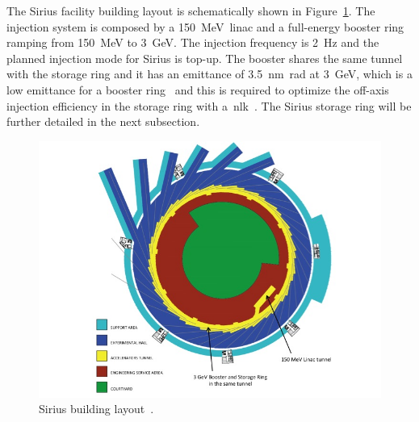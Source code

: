 The Sirius facility building layout is schematically shown in Figure~\ref{fig:sirius_building}. The injection system is composed by a \SI{150}{\mega\electronvolt}~\gls{linac} and a full-energy booster ring ramping from \SI{150}{\mega\electronvolt} to \SI{3}{\giga\electronvolt}. The injection frequency is \SI{2}{\hertz} and the planned injection mode for Sirius is top-up. The booster shares the same tunnel with the storage ring and it has an emittance of \SI{3.5}{\nano\meter\radian} at \SI{3}{\giga\electronvolt}, which is a low emittance for a booster ring~\cite{sa2014a} and this is required to optimize the off-axis injection efficiency in the storage ring with a~\gls{nlk}~\cite{liu2016a}. The Sirius storage ring will be further detailed in the next subsection.
\begin{figure}
    \centering
    \includegraphics[scale=0.5]{figures/sirius_building.jpg}
    \caption{Sirius building layout~\cite{wiki}.}
    \label{fig:sirius_building}
\end{figure}
